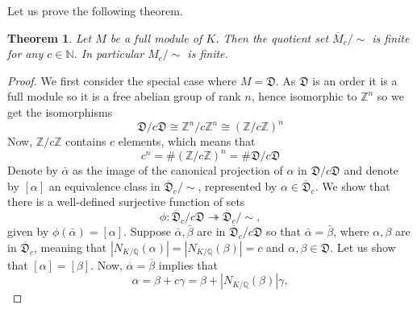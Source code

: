\documentclass{article}
\newtheorem{theorem}{Theorem}[section]
\newcommand{\mfrak}[1]{\mathfrak{#1}}
\newcommand{\mbb}[1]{\mathbb{#1}}
\numberwithin{equation}{section}
\begin{document}
Let us prove the following theorem. 
\begin{theorem}\label{thm: Finitely many solutions up to assoc}
    Let $M$ be a full module of $K$. Then the quotient set $\overline M_c / \sim$ is finite for any $c \in \mbb N$. In particular $M_c / \sim$ is finite.
\end{theorem}
\begin{proof}
    We first consider the special case where $M = \mfrak D$. As $\mfrak D$ is an order it is a full module so it is a free abelian group of rank $n$, hence isomorphic to $\mbb Z^n$ so we get the isomorphisms
    $$\mfrak D/c \mfrak D \cong \mbb Z^n/c \mbb Z^n \cong (\mbb Z/c \mbb Z)^n$$
    Now, $\mbb Z / c \mbb Z$ contains $c$ elements, which means that
    $$c^n = \# (\mbb Z/c \mbb Z)^n = \# \mfrak D/c \mfrak D$$
    Denote by $\bar \alpha$ as the image of the canonical projection of $\alpha$ in $\mfrak D/c \mfrak D$ and denote by $[\alpha]$ an equivalence class in $\overline {\mfrak D}_c / \sim$, represented by $\alpha \in \overline {\mfrak D}_c$. We show that there is a well-defined surjective function of sets
    $$\phi : \overline {\mfrak D}_c /c \mfrak D \twoheadrightarrow  \overline {\mfrak D}_c / \sim,$$
    given by $\phi(\bar \alpha) = [\alpha]$. Suppose $\bar \alpha, \bar \beta$ are in $\overline {\mfrak D}_c /c \mfrak D$ so that $\bar \alpha = \bar \beta$, where $\alpha, \beta$ are in $\overline {\mfrak D}_c$, meaning that $|N_{K/\mbb Q}(\alpha)| = |N_{K/\mbb Q}(\beta)| = c$ and $\alpha, \beta \in \mfrak D$. Let us show that $[\alpha] = [\beta]$. Now, $\overline \alpha = \overline \beta$ implies that
    $$\alpha = \beta + c \gamma = \beta + |N_{K/\mbb Q}(\beta)| \gamma,$$

\end{proof}
\end{document}

